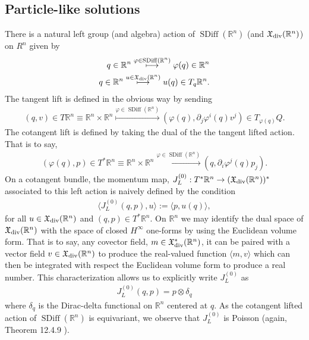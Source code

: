 \documentclass[12pt]{amsart}
\newcommand{\R}{\ensuremath{\mathbb{R}}}
\DeclareMathOperator{\SDiff}{SDiff}
\begin{document}
\subsection{Particle-like solutions}
\label{sec:Momentum maps}
There is a natural left group (and algebra) action of $\SDiff(\R^n)$
(and $\mathfrak{X}_{\rm div}(\R^n)$) on $R^n$ given by
\begin{align*}
  q \in \R^n
  \stackrel{ \varphi \in \SDiff(\R^n) }{\longmapsto}
  \varphi(q) \in \R^n \\
  q \in \R^n 
  \stackrel{ u \in \mathfrak{X}_{\rm div}(\R^n) }{\longmapsto}
  u(q) \in T_q\R^n.
\end{align*}
The tangent lift is defined in the obvious way by sending
\begin{align*}
  (q,v) \in T\R^n \equiv \R^n \times \R^n
  \stackrel{ \varphi \in \SDiff(\R^n) }{\longmapsto}
  (\varphi(q) , \partial_j\varphi^i(q) v^j ) \in T_{\varphi(q)} Q.
\end{align*}
The cotangent lift is defined by taking the dual
of the the tangent lifted action.
That is to say,
\begin{align*}
  (\varphi(q) , p ) \in T^*\R^n \equiv \R^n \times \R^n
  \stackrel{ \varphi \in \SDiff(\R^n) }{\longmapsto}
  ( q , \partial_i\varphi^j(q) p_j ).
\end{align*}
On a cotangent bundle, the momentum map,
$J_L^{(0)} : T^*\R^n \to (\mathfrak{X}_{\rm div}(\R^n) )^*$
associated to this left action is naively defined by the
condition
\begin{align*}
  \langle J_L^{(0)}( q , p) , u \rangle := \langle p , u(q) \rangle,
\end{align*}
for all $u \in \mathfrak{X}_{\rm div}(\R^n)$ and $(q,p) \in T^*\R^n$.
On $\R^n$ we may identify the dual space of $\mathfrak{X}_{\rm div}(\R^n)$
with the space of closed $H^\infty$ one-forms by using the Euclidean volume form.
That is to say, any covector field, $m \in \mathfrak{X}^*_{\rm div}(\R^n)$, it can be paired with a vector field $v \in \mathfrak{X}_{\rm div}(\R^n)$ to produce the real-valued function $\langle m , v \rangle$ which can then be integrated with respect the Euclidean volume form to produce a real number.
This characterization allows us to explicitly write $J_L^{(0)}$ as
\begin{align*}
  J_L^{(0)}( q , p ) = p \otimes \delta_q
\end{align*}
where $\delta_q$ is the Dirac-delta functional on $\R^n$ centered at $q$.
As the cotangent lifted action of $\SDiff(\R^n)$ is equivariant,
we observe that $J_L^{(0)}$ is Poisson (again, Theorem 12.4.9 \cite{MandS}).
\end{document}
